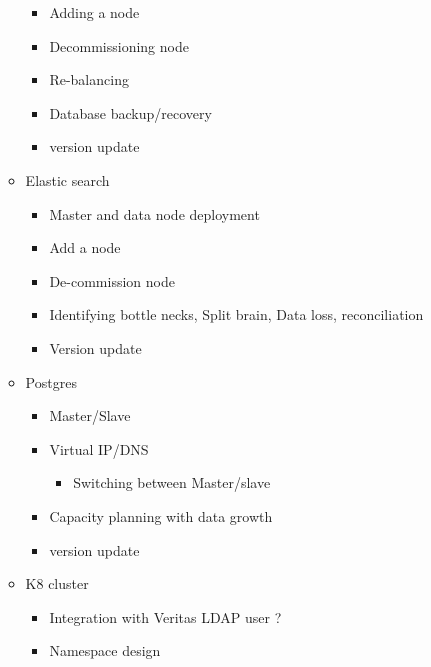 \documentclass[letterpaper,10pt,english]{sphinxmanual}
\begin{document}
\begin{enumerate}
\begin{itemize}
\begin{itemize}
\item {} 
Adding a node

\item {} 
Decommissioning node

\item {} 
Re-balancing

\item {} 
Database backup/recovery

\item {} 
version update

\end{itemize}

\item {} 
Elastic search
\begin{itemize}
\item {} 
Master and data node deployment

\item {} 
Add a node

\item {} 
De-commission node

\item {} 
Identifying bottle necks, Split brain, Data loss, reconciliation

\item {} 
Version update

\end{itemize}

\item {} 
Postgres
\begin{itemize}
\item {} 
Master/Slave

\item {} 
Virtual IP/DNS
\begin{itemize}
\item {} 
Switching between Master/slave

\end{itemize}

\item {} 
Capacity planning with data growth

\item {} 
version update

\end{itemize}

\item {} 
K8 cluster
\begin{itemize}
\item {} 
Integration with Veritas LDAP user ?

\item {} 
Namespace design


\end{itemize}
\end{itemize}
\end{enumerate}
\end{document}
